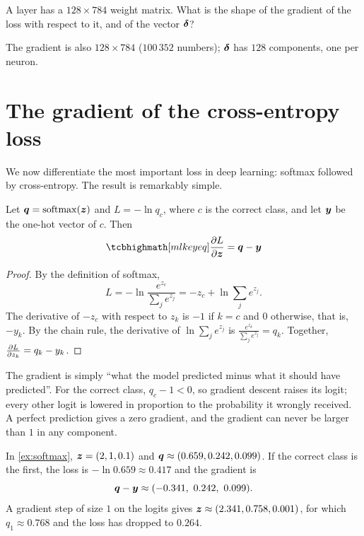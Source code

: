 \begin{exercise}
A layer has a $128\times784$ weight matrix. What is the shape of the gradient of
the loss with respect to it, and of the vector $\bm{\delta}$?
\end{exercise}
\begin{solution}
The gradient is also $128\times784$ ($100\,352$ numbers); $\bm{\delta}$ has $128$
components, one per neuron.
\end{solution}

\section{The gradient of the cross-entropy loss}\label{sec:softmax-gradient}

We now differentiate the most important loss in deep learning: softmax followed by
cross-entropy. The result is remarkably simple.

\begin{theorem}\label{thm:softmax-ce-gradient}
Let $\bm{q} = \operatorname{softmax}(\bm{z})$ and $L = -\ln q_c$, where $c$ is the correct class, and
let $\bm{y}$ be the one-hot vector of $c$. Then
\[
  \keyeq{\pderiv{L}{\vz} = \vq - \vy}
\]
\end{theorem}

\begin{proof}
By the definition of softmax,
\[
  L = -\ln\frac{e^{z_c}}{\sum_je^{z_j}} = -z_c + \ln\sum_je^{z_j} .
\]
The derivative of $-z_c$ with respect to $z_k$ is $-1$ if $k = c$ and $0$
otherwise, that is, $-y_k$. By the chain rule, the derivative of
$\ln\sum_je^{z_j}$ is $\frac{e^{z_k}}{\sum_je^{z_j}} = q_k$. Together,
$\frac{\partial L}{\partial z_k} = q_k - y_k$.
\end{proof}

\begin{intuition}
The gradient is simply ``what the model predicted minus what it should have
predicted''. For the correct class, $q_c - 1 < 0$, so gradient descent raises its
logit; every other logit is lowered in proportion to the probability it wrongly
received. A perfect prediction gives a zero gradient, and the gradient can never
be larger than $1$ in any component.
\end{intuition}

\begin{example}\label{ex:softmax-step}
In \cref{ex:softmax}, $\bm{z} = (2, 1, 0.1)$ and $\bm{q} \approx (0.659, 0.242, 0.099)$.
If the correct class is the first, the loss is $-\ln0.659 \approx 0.417$ and the
gradient is
\[
  \bm{q} - \bm{y} \approx (-0.341,\ 0.242,\ 0.099).
\]
A gradient step of size $1$ on the logits gives $\bm{z} \approx (2.341, 0.758,
0.001)$, for which $q_1 \approx 0.768$ and the loss has dropped to $0.264$.
\end{example}

